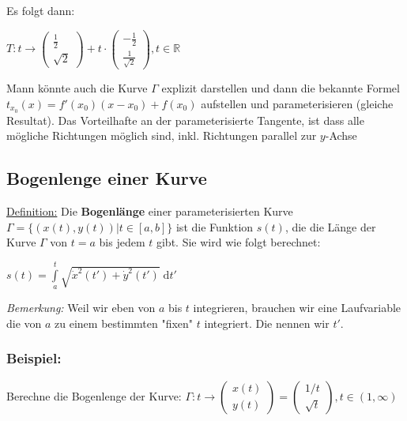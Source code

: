 \documentclass[11pt]{article} %
\begin{document}
Es folgt dann:

$T: t \rightarrow  \left(\!
    \begin{array}{c}
     \frac{1}{2} \\
     \sqrt{2}
    \end{array}
  \!\right) + t \cdot \left(\!
    \begin{array}{c}
      -\frac{1}{2}  \\
      \frac{1}{\sqrt{2}}
    \end{array}
  \!\right), t \in \mathbb{R}$

Mann könnte auch die Kurve $\Gamma$ explizit darstellen und dann die bekannte Formel $t_{x_0}(x) = f'(x_0)(x-x_0) + f(x_0)$ aufstellen und parameterisieren (gleiche Resultat). Das Vorteilhafte an der parameterisierte Tangente, ist dass alle mögliche Richtungen möglich sind, inkl. Richtungen parallel zur $y$-Achse

\subsection{Bogenlenge einer Kurve}
\underline{Definition:} Die {\bf Bogenlänge} einer parameterisierten Kurve $\Gamma = \{(x(t),y(t)) |t \in [a,b] \}$ ist die Funktion $s(t)$, die die Länge der Kurve $\Gamma$ von $t=a$ bis jedem $t$ gibt. Sie wird wie folgt berechnet:

\begin{center}
$s(t) = \int \limits_a^t \sqrt{\dot x^2(t') + \dot y^2(t')} \; \text{d}t' $
\end{center}

\emph{Bemerkung:} Weil wir eben von $a$ bis $t$ integrieren, brauchen wir eine Laufvariable die von $a$ zu einem bestimmten "fixen" $t$ integriert. Die nennen wir $t'$.

\subsubsection{Beispiel:}

Berechne die Bogenlenge der Kurve:
$\Gamma: t \rightarrow  \left(\!
    \begin{array}{c}
     x(t)   \\
     y(t) 
    \end{array}
  \!\right) = \left(\!
    \begin{array}{c}
     1/t   \\
     \sqrt{t} 
    \end{array}
  \!\right), t \in (1, \infty)$\\
\end{document}
